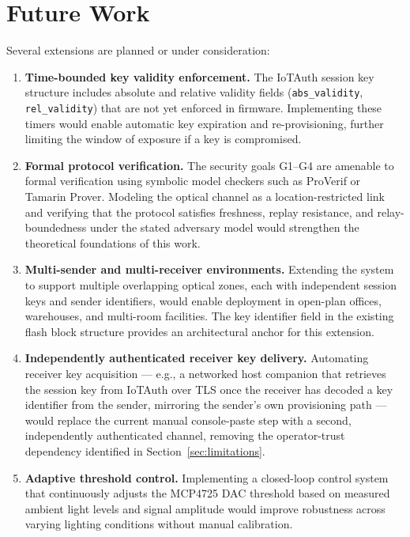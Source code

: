 \documentclass[conference]{IEEEtran}
\begin{document}
\section{Future Work}
\label{sec:future-work}

Several extensions are planned or under consideration:

\begin{enumerate}
\item \textbf{Time-bounded key validity enforcement.} The IoTAuth session key structure includes absolute and relative validity fields (\texttt{abs\_validity}, \texttt{rel\_validity}) that are not yet enforced in firmware. Implementing these timers would enable automatic key expiration and re-provisioning, further limiting the window of exposure if a key is compromised.

\item \textbf{Formal protocol verification.} The security goals G1--G4 are amenable to formal verification using symbolic model checkers such as ProVerif or Tamarin Prover. Modeling the optical channel as a location-restricted link and verifying that the protocol satisfies freshness, replay resistance, and relay-boundedness under the stated adversary model would strengthen the theoretical foundations of this work.

\item \textbf{Multi-sender and multi-receiver environments.} Extending the system to support multiple overlapping optical zones, each with independent session keys and sender identifiers, would enable deployment in open-plan offices, warehouses, and multi-room facilities. The key identifier field in the existing flash block structure provides an architectural anchor for this extension.

\item \textbf{Independently authenticated receiver key delivery.} Automating receiver key acquisition — e.g., a networked host companion that retrieves the session key from IoTAuth over TLS once the receiver has decoded a key identifier from the sender, mirroring the sender's own provisioning path — would replace the current manual console-paste step with a second, independently authenticated channel, removing the operator-trust dependency identified in Section~\ref{sec:limitations}.

\item \textbf{Adaptive threshold control.} Implementing a closed-loop control system that continuously adjusts the MCP4725 DAC threshold based on measured ambient light levels and signal amplitude would improve robustness across varying lighting conditions without manual calibration.


\end{enumerate}
\end{document}
